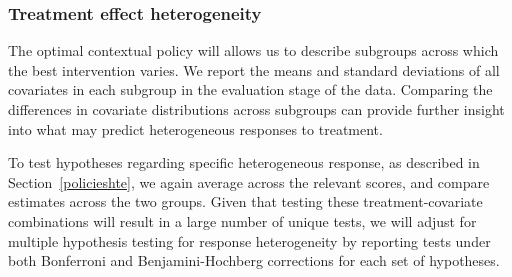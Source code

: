 \documentclass[letterpaper, 12pt, parskip=full,DIV=10]{scrartcl}
\begin{document}
\subsubsection{Treatment effect heterogeneity}
The optimal contextual policy will allows us to describe subgroups across which the best intervention varies. We report the means and standard deviations of all covariates in each subgroup in the evaluation stage of the data. Comparing the differences in covariate distributions across subgroups can provide further insight into what may predict heterogeneous responses to treatment. 

To test hypotheses regarding specific heterogeneous response, as described in Section~\ref{policieshte}, we again average across the relevant scores, and compare estimates across the two groups. Given that testing these treatment-covariate combinations will result in a large number of unique tests, we will adjust for multiple hypothesis testing for response heterogeneity by reporting tests under both Bonferroni and Benjamini-Hochberg corrections for each set of hypotheses.
\end{document}
